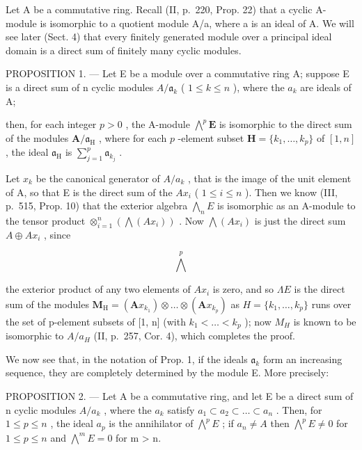 Let A be a commutative ring. Recall (II, p.~220, Prop. 22) that a cyclic A-module is isomorphic to a quotient module A/a, where a is an ideal of A. We will see later (Sect. 4) that every finitely generated module over a principal ideal domain is a direct sum of finitely many cyclic modules.

PROPOSITION 1. --- Let E be a module over a commutative ring A; suppose E is a direct sum of n cyclic modules \(A/\mathfrak{a}_{k}\) ( \(1 \leqslant k \leqslant n\) ), where the \(a_{k}\) are ideals of A;

then, for each integer \(p > 0\) , the A-module \(\bigwedge^p \mathbf{E}\) is isomorphic to the direct sum of the modules \(\mathbf{A} / \mathfrak{a}_{\mathrm{H}}\) , where for each \(p\) -element subset \(\mathbf{H} = \{k_1, \dots, k_p\}\) of \([1, n]\) , the ideal \(\mathfrak{a}_{\mathrm{H}}\) is \(\sum_{j=1}^{p} \mathfrak{a}_{k_j}\) .

Let \(x_{k}\) be the canonical generator of \(A / a_{k}\) , that is the image of the unit element of A, so that E is the direct sum of the \(Ax_{i}\) ( \(1 \leqslant i \leqslant n\) ). Then we know (III, p.~515, Prop. 10) that the exterior algebra \(\bigwedge_{n} E\) is isomorphic as an A-module to the tensor product \(\otimes_{i=1}^{n} (\bigwedge(Ax_{i}))\) . Now \(\bigwedge(Ax_{i})\) is just the direct sum \(A \oplus Ax_{i}\) , since

\[
\bigwedge^ {p}
\]

the exterior product of any two elements of \(Ax_{i}\) is zero, and so \(\Lambda E\) is the direct sum of the modules \(\mathbf{M}_{\mathrm{H}} = (\mathbf{A}x_{k_{1}}) \otimes \ldots \otimes (\mathbf{A}x_{k_{p}})\) as \(H = \{k_{1}, \ldots, k_{p}\}\) runs over the set of p-element subsets of {[}1, n{]} (with \(k_{1} < \ldots < k_{p}\) ); now \(M_{H}\) is known to be isomorphic to \(A/a_{H}\) (II, p.~257, Cor. 4), which completes the proof.

We now see that, in the notation of Prop. 1, if the ideals \(\mathfrak{a}_k\) form an increasing sequence, they are completely determined by the module E. More precisely:

PROPOSITION 2. --- Let A be a commutative ring, and let E be a direct sum of n cyclic modules \(A/a_{k}\) , where the \(a_{k}\) satisfy \(a_{1} \subset a_{2} \subset \ldots \subset a_{n}\) . Then, for \(1 \leqslant p \leqslant n\) , the ideal \(a_{p}\) is the annihilator of \(\bigwedge^{p} E\) ; if \(a_{n} \neq A\) then \(\bigwedge^{p} E \neq 0\) for \(1 \leqslant p \leqslant n\) and \(\bigwedge^{m} E = 0\) for m \textgreater{} n.

